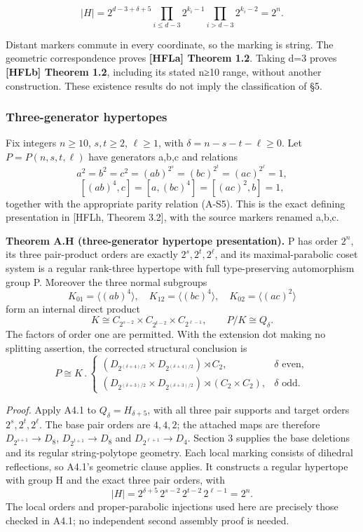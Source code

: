 \documentclass[
  11pt,
  a4paper,
]{article}
\begin{document}
\[
 |H|=2^{d-3+\delta+5}
       \prod_{i\le d-3}2^{k_i-1}
       \prod_{i>d-3}2^{k_i-2}=2^n.
\]

Distant markers commute in every coordinate, so the marking is string.
The geometric correspondence proves \textbf{{[}HFLa{]} Theorem 1.2}.
Taking d=3 proves \textbf{{[}HFLb{]} Theorem 1.2}, including its stated
n≥10 range, without another construction. These existence results do not
imply the classification of §5.

\subsubsection{Three-generator
hypertopes}\label{three-generator-hypertopes}

Fix integers \(n\ge10\), \(s,t\ge2\), \(\ell\ge1\), with
\(\delta=n-s-t-\ell\ge0\). Let \(P=P(n,s,t,\ell)\) have generators a,b,c
and relations \[
 a^2=b^2=c^2=(ab)^{2^s}=(bc)^{2^t}=(ac)^{2^\ell}=1,
\] \[
 [(ab)^4,c]=[a,(bc)^4]=[(ac)^2,b]=1,
 \tag{A-H1}
\] together with the appropriate parity relation (A-S5). This is the
exact defining presentation in {[}HFLh, Theorem 3.2{]}, with the source
markers renamed a,b,c.

\textbf{Theorem A.H (three-generator hypertope presentation).} P has
order \(2^n\), its three pair-product orders are exactly
\(2^s,2^t,2^\ell\), and its maximal-parabolic coset system is a regular
rank-three hypertope with full type-preserving automorphism group P.
Moreover the three normal subgroups \[
 K_{01}=\langle(ab)^4\rangle,\quad
 K_{12}=\langle(bc)^4\rangle,\quad
 K_{02}=\langle(ac)^2\rangle
\] form an internal direct product \[
 K\cong C_{2^{s-2}}\times C_{2^{t-2}}\times C_{2^{\ell-1}},
 \qquad P/K\cong Q_\delta.
 \tag{A-H2}
\] The factors of order one are permitted. With the extension dot making
no splitting assertion, the corrected structural conclusion is \[
 P\cong K\mathbin{.}
 \begin{cases}
 (D_{2^{(\delta+4)/2}}\times D_{2^{(\delta+4)/2}})\rtimes C_2,
     &\delta\text{ even},\\
 (D_{2^{(\delta+3)/2}}\times D_{2^{(\delta+3)/2}})\rtimes(C_2\times C_2),
     &\delta\text{ odd}.
 \end{cases}
 \tag{A-H3}
\]

\emph{Proof.} Apply A4.1 to \(Q_\delta=H_{\delta+5}\), with all three
pair supports and target orders \(2^s,2^t,2^\ell\). The base pair orders
are \(4,4,2\); the attached maps are therefore \(D_{2^{s+1}}\to D_8\),
\(D_{2^{t+1}}\to D_8\) and \(D_{2^{\ell+1}}\to D_4\). Section 3 supplies
the base deletions and its regular string-polytope geometry. Each local
marking consists of dihedral reflections, so A4.1's geometric clause
applies. It constructs a regular hypertope with group H and the exact
three pair orders, with \[
 |H|=2^{\delta+5}\,2^{s-2}\,2^{t-2}\,2^{\ell-1}=2^n.
\] The local orders and proper-parabolic injections used here are
precisely those checked in A4.1; no independent second assembly proof is
needed.
\end{document}
